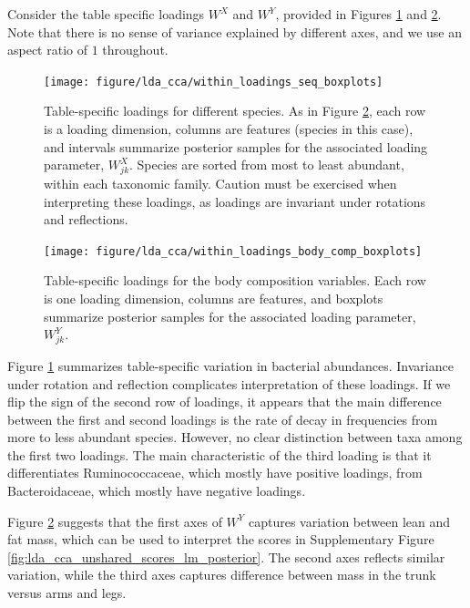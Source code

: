 \documentclass[14pt]{extarticle}
\begin{document}
Consider the table specific loadings $W^{X}$ and $W^{Y}$, provided in Figures
\ref{fig:lda_cca_within_loadings_seq_boxplots} and
\ref{fig:lda_cca_within_loadings_body_comp_boxplots}. Note that there is no
sense of variance explained by different axes, and we use an aspect ratio of $1$
throughout.

\begin{figure}
  \centering
  \texttt{[image: figure/lda\_cca/within\_loadings\_seq\_boxplots]}
  \caption{Table-specific loadings for different species. As in Figure
    \ref{fig:lda_cca_within_loadings_body_comp_boxplots}, each row is a loading
    dimension, columns are features (species in this case), and intervals
    summarize posterior samples for the associated loading parameter,
    $W^{X}_{jk}$. Species are sorted from most to least abundant, within each
    taxonomic family. Caution must be exercised when interpreting these
    loadings, as loadings are invariant under rotations and
    reflections. \label{fig:lda_cca_within_loadings_seq_boxplots}}
\end{figure}

\begin{figure}
  \centering
  \texttt{[image: figure/lda\_cca/within\_loadings\_body\_comp\_boxplots]}
  \caption{Table-specific loadings for the body composition variables. Each row
    is one loading dimension, columns are features, and boxplots summarize
    posterior samples for the associated loading parameter, $W_{jk}^{Y}$.
  \label{fig:lda_cca_within_loadings_body_comp_boxplots}}
\end{figure}

Figure \ref{fig:lda_cca_within_loadings_seq_boxplots} summarizes table-specific variation in
bacterial abundances. Invariance under rotation and reflection complicates
interpretation of these loadings. If we flip the sign of the second row of
loadings, it appears that the main difference between the first and second
loadings is the rate of decay in frequencies from more to less abundant species.
However, no clear distinction between taxa among the first two loadings. The
main characteristic of the third loading is that it differentiates
Ruminococcaceae, which mostly have positive loadings, from Bacteroidaceae, which
mostly have negative loadings.

Figure \ref{fig:lda_cca_within_loadings_body_comp_boxplots} suggests that the
first axes of $W^{Y}$ captures variation between lean and fat mass, which can be
used to interpret the scores in Supplementary Figure
\ref{fig:lda_cca_unshared_scores_lm_posterior}. The second axes reflects similar
variation, while the third axes captures difference between mass in the trunk
versus arms and legs.
\end{document}
